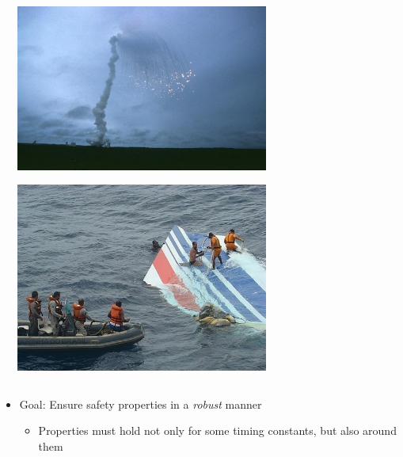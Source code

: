 \documentclass[professionalfont]{beamer}
\newcommand{\couleur}[1]{\textcolor{couleurimportante}{#1}}
\begin{document}
\begin{frame}
\begin{columns}
\begin{column}[c]{0.45 \textwidth}
{		}
		
	\end{column}

	\begin{column}[c]{0.45 \textwidth}
	
		\medskip
	
		{
		\centering
		\includegraphics[width=0.65\textwidth]{figures/ariane5.jpg}

		\bigskip

		\includegraphics[width=0.65\textwidth]{figures/AF447-crash.jpg}
		
		}
		
	\end{column}
\end{columns}

\medskip

\begin{itemize}
	\item Goal: Ensure safety properties in a \emph{robust} manner
	\begin{itemize}
		\item Properties must hold not only for some timing constants, but also \couleur{around} them
	\end{itemize}
\end{itemize}


\end{frame}
\end{document}
